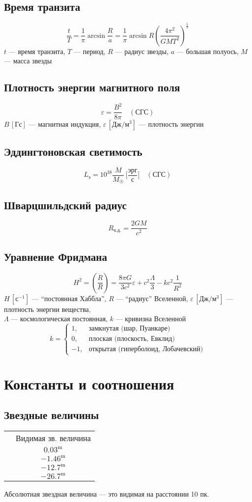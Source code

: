 \documentclass[12pt]{article}
\begin{document}
\subsection{Время транзита}
\[\frac{t}{T}=\frac{1}{\pi}\arcsin\frac Ra=\frac1\pi\arcsin R\left(\frac{4\pi^2}{GMT^2}\right)^{\frac13}\]
$t$ --- время транзита, $T$ --- период, $R$ --- радиус звезды, $a$ --- большая полуось, $M$ --- масса звезды
\subsection{Плотность энергии магнитного поля}
\[\varepsilon=\frac{B^2}{8\pi}\quad(\text{СГС})\]
$B\,[\text{Гс}]$ --- магнитная индукция, $\varepsilon\,[\text{Дж}/\text{м}^3]$ --- плотность энергии
\subsection{Эддингтоновская светимость}
\[L_\text{э}=10^{38}\frac{M}{M_{\astrosun}}\,\biggl[\frac{\text{эрг}}{\text{с}}\biggr]\quad(\text{СГС})\]
\subsection{Шварцшильдский радиус}
\[R_\text{ч.д.}=\frac{2GM}{c^2}\]
\subsection{Уравнение Фридмана}
\[H^2=\left(\frac{\dot{R}}{R}\right)=\frac{8\pi G}{3c^2}\varepsilon+c^2\frac{\Lambda}{3}-kc^2\frac{1}{R^2}\]
$H\,[\text{с}^{-1}]$ --- ``постоянная Хаббла'', $R$ --- ``радиус'' Вселенной, $\varepsilon\,[\text{Дж}/\text{м}^3]$ --- плотность энергии вещества,\\
$\Lambda$ --- космологическая постоянная, $k$ --- кривизна Вселенной
\[k=\begin{cases}
1, & \text{замкнутая (шар, Пуанкаре)}\\
0, & \text{плоская (плоскость, Евклид)}\\
-1, & \text{открытая (гиперболоид, Лобачевский)}
\end{cases}\]
\section{Константы и соотношения}
\subsection{Звездные величины}
\begin{center}\begin{tabular}{|c|c|}
 & Видимая зв. величина\\
 & $0.03^\text{m}$\\
 & $-1.46^\text{m}$\\
 & $-12.7^\text{m}$\\
 & $-26.7^\text{m}$\\
\hline
\end{tabular}\end{center}
Абсолютная звездная величина --- это видимая на расстоянии 10 пк.
\end{document}
